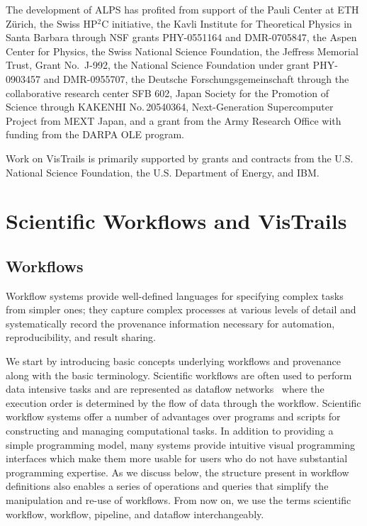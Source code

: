 \documentclass[12pt]{iopart}
\begin{document}
The development of ALPS has profited from support of the Pauli Center at ETH Z\"urich, the Swiss HP$^2$C initiative, the Kavli Institute for Theoretical Physics in Santa Barbara through NSF grants PHY-0551164 and DMR-0705847, the Aspen Center for Physics, the Swiss National Science Foundation, the Jeffress Memorial Trust, Grant No.~J-992, the National Science Foundation under grant PHY-0903457 and DMR-0955707, the Deutsche Forschungsgemeinschaft through the collaborative research center SFB 602, Japan Society for the Promotion of Science through KAKENHI No.\,20540364, Next-Generation Supercomputer Project from MEXT Japan, and a grant from the Army Research Office with funding from the DARPA OLE program. 

Work on VisTrails is primarily supported by grants and contracts from
the U.S. National Science Foundation, the U.S. Department of Energy,
and IBM.

\appendix

\section{Scientific Workflows and VisTrails}


\subsection{Workflows}

Workflow systems provide well-defined languages for specifying complex
tasks from simpler ones; they capture complex processes at various
levels of detail and systematically record the provenance information
necessary for automation, reproducibility, and result sharing.

We start by introducing basic concepts underlying
workflows and provenance along with the basic terminology.
Scientific workflows are often used to perform data intensive tasks
and are represented as dataflow networks~\cite{lee@ieee1995} where the
execution order is determined by the flow of data through the
workflow. Scientific workflow systems offer a number of advantages
over programs and scripts for constructing and
managing computational tasks. In addition to providing a simple
programming model, many systems provide intuitive visual programming
interfaces which make them more usable for users who do not have
substantial programming expertise. As we discuss below, the structure
present in workflow definitions also enables a series of operations
and queries that simplify the manipulation and re-use of workflows.
From now on, we use the terms scientific workflow, workflow, pipeline,
and dataflow interchangeably.
\end{document}

